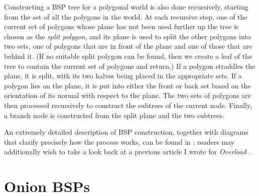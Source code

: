 \documentclass[10pt,twocolumn]{article}
\begin{document}
Constructing a BSP tree for a polygonal world is also done recursively, starting from the set of all the polygons in the world. At each recursive step, one of the current set of polygons whose plane has not been used further up the tree is chosen as the \emph{split polygon}, and its plane is used to split the other polygons into two sets, one of polygons that are in front of the plane and one of those that are behind it. (If no suitable split polygon can be found, then we create a leaf of the tree to contain the current set of polygons and return.) If a polygon straddles the plane, it is split, with its two halves being placed in the appropriate sets. If a polygon lies on the plane, it is put into either the front or back set based on the orientation of its normal with respect to the plane. The two sets of polygons are then processed recursively to construct the subtrees of the current node. Finally, a branch node is constructed from the split plane and the two subtrees.

An extremely detailed description of BSP construction, together with diagrams that clarify precisely how the process works, can be found in \cite{golodetz06}; readers may additionally wish to take a look back at a previous article I wrote for \emph{Overload} \cite{golodetzoverload08aug}.

\section{Onion BSPs}
\label{sec:onionbsps}
\end{document}

